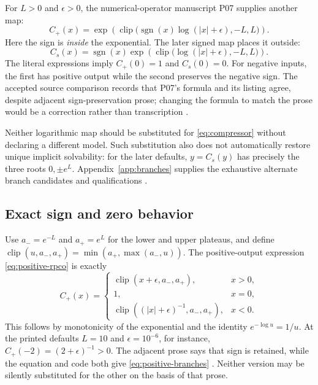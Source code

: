 \documentclass[11pt,a4paper]{article}
\theoremstyle{definition}
\DeclareMathOperator{\sgn}{sgn}
\DeclareMathOperator{\clip}{clip}
\numberwithin{equation}{section}
\begin{document}
For $L>0$ and $\epsilon>0$, the numerical-operator manuscript P07 supplies
another map:
\begin{equation}
 C_+(x)=\exp\!\left(
 \clip\bigl(\sgn(x)\log(|x|+\epsilon),-L,L\bigr)\right).
 \label{eq:positive-rpco}
\end{equation}
Here the sign is \emph{inside} the exponential. The later signed map places
it outside:
\begin{equation}
 C_s(x)=\sgn(x)\exp\!\left(
 \clip\bigl(\log(|x|+\epsilon),-L,L\bigr)\right).
 \label{eq:signed-rpco}
\end{equation}
The literal expressions imply $C_+(0)=1$ and $C_s(0)=0$. For negative
inputs, the first has positive output while the second preserves the negative
sign. The accepted source comparison records that P07's formula and its
listing agree, despite adjacent sign-preservation prose; changing the
formula to match the prose would be a correction rather than transcription
\cite[physical p.~3]{P07} \cite[\S4.1]{F01}.

Neither logarithmic map should be substituted for
\eqref{eq:compressor} without declaring a different model. Such substitution
also does not automatically restore unique implicit solvability: for the
later defaults, $y=C_s(y)$ has precisely the three roots
$0,\pm e^L$. Appendix~\ref{app:branches} supplies the exhaustive alternate
branch candidates and qualifications \cite[\S\S2--3]{Branch}.

\subsection{Exact sign and zero behavior}
\label{sec:compression-details}

Use $a_-=e^{-L}$ and $a_+=e^L$ for the lower and upper plateaus, and define
$\clip(u,a_-,a_+)=\min(a_+,\max(a_-,u))$. The positive-output expression
\eqref{eq:positive-rpco} is exactly
\begin{equation}
 C_+(x)=
 \begin{cases}
 \clip(x+\epsilon,a_-,a_+),&x>0,\\
 1,&x=0,\\
 \clip((|x|+\epsilon)^{-1},a_-,a_+),&x<0.
 \end{cases}
 \label{eq:positive-branches}
\end{equation}
This follows by monotonicity of the exponential and the identity
$e^{-\log u}=1/u$. At the printed defaults $L=10$ and
$\epsilon=10^{-6}$, for instance, $C_+(-2)=(2+\epsilon)^{-1}>0$.
The adjacent prose says that sign is retained, while the equation and code
both give \eqref{eq:positive-branches}
\cite[physical p.~3, \S2.1]{P07}. Neither version may be silently substituted
for the other on the basis of that prose.
\end{document}
